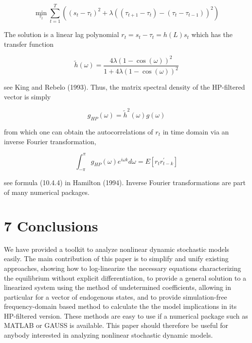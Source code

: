 \documentclass[10pt]{article}
\begin{document}
\begin{equation*}
\min _{\tau_{t}} \sum_{t=1}^{T}\left(\left(s_{t}-\tau_{t}\right)^{2}+\lambda\left(\left(\tau_{t+1}-\tau_{t}\right)-\left(\tau_{t}-\tau_{t-1}\right)\right)^{2}\right)
\end{equation*}

The solution is a linear lag polynomial $r_{t}=s_{t}-\tau_{t}=h(L) s_{t}$ which has the transfer function

\begin{equation*}
\tilde{h}(\omega)=\frac{4 \lambda(1-\cos (\omega))^{2}}{1+4 \lambda(1-\cos (\omega))^{2}}
\end{equation*}

see King and Rebelo (1993). Thus, the matrix spectral density of the HP-filtered vector is simply

\begin{equation*}
g_{H P}(\omega)=\tilde{h}^{2}(\omega) g(\omega)
\end{equation*}

from which one can obtain the autocorrelations of $r_{t}$ in time domain via an inverse Fourier transformation,

\begin{equation*}
\int_{-\pi}^{\pi} g_{H P}(\omega) e^{i \omega k} d \omega=E\left[r_{t} r_{t-k}^{\prime}\right]
\end{equation*}

see formula (10.4.4) in Hamilton (1994). Inverse Fourier transformations are part of many numerical packages.

\section*{7 Conclusions}
We have provided a toolkit to analyze nonlinear dynamic stochastic models easily. The main contribution of this paper is to simplify and unify existing approaches, showing how to log-linearize the necessary equations characterizing the equilibrium without explicit differentiation, to provide a general solution to a linearized system using the method of undetermined coefficients, allowing in particular for a vector of endogenous states, and to provide simulation-free frequency-domain based method to calculate the the model implications in its HP-filtered version. These methods are easy to use if a numerical package such as MATLAB or GAUSS is available. This paper should therefore be useful for anybody interested in analyzing nonlinear stochastic dynamic models.
\end{document}
